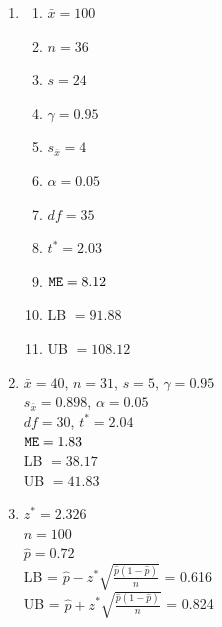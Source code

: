 \documentclass[12pt,letterpaper]{article}
\begin{document}
\begin{multicols}{2}
\begin{enumerate}
\item \begin{enumerate}
\item $\bar{x} = 100$
\item $n=36$
\item $s = 24$
\item $\gamma = 0.95$
\item $s_{\bar{x}} = 4$
\item $\alpha = 0.05$
\item $df=35$
\item $t^* = 2.03$
\item $\mathtt{ME} = 8.12$
\item LB $= 91.88$
\item UB $= 108.12$
\end{enumerate}

\item $\bar{x} = 40$, $n=31$, $s = 5$, $\gamma = 0.95$\\
$s_{\bar{x}} = 0.898$, $\alpha = 0.05$\\ $df = 30$, $t^*=2.04$
\\$\mathtt{ME} = 1.83$ \\
LB $= 38.17$ \\
UB $= 41.83$

\item $z^*=2.326$\\
$n=100$\\
$\hat{p} = 0.72$\\
LB = $\hat{p}-z^* \sqrt{\frac{\hat{p}(1-\hat{p})}{n}}$ = 0.616\\
UB = $\hat{p}+z^* \sqrt{\frac{\hat{p}(1-\hat{p})}{n}}$ = 0.824

\end{enumerate}
\end{multicols}
\end{document}
